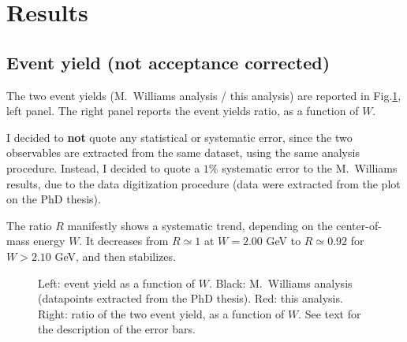 \documentclass[a4paper,10pt]{report}
\begin{document}
\section{Results}

\subsection{Event yield (not acceptance corrected)}
The two event yields (M.~Williams analysis / this analysis) are reported in Fig.\ref{fig:events}, left panel. The right panel reports the event yields ratio, as a function of $W$.

I decided to \textbf{not} quote any statistical or systematic error, since the two observables are extracted from the same dataset, using the same analysis procedure.
Instead, I decided to quote a $1\%$ systematic error to the M.~Williams results, due to the data digitization procedure (data were extracted from the plot on the PhD thesis).

The ratio $R$ manifestly shows a systematic trend, depending on the center-of-mass energy $W$. It decreases from $R\simeq 1$ at $W=2.00$ GeV to $R\simeq 0.92$ for $W > 2.10$ GeV, and then stabilizes. 

\begin{figure}[tpb]
\centering
{}
\caption{\label{fig:events} Left: event yield as a function of $W$. Black: M.~Williams analysis (datapoints extracted from the PhD thesis). Red: this analysis.
Right: ratio of the two event yield, as a function of $W$. See text for the description of the error bars.}
\end{figure}
\end{document}
